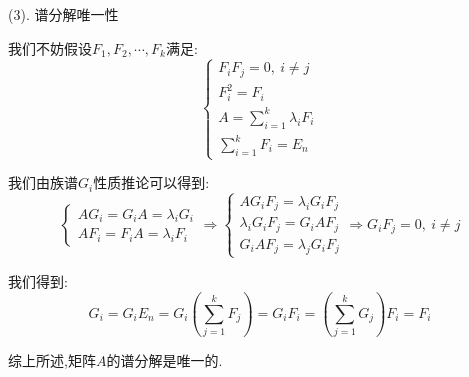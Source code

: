 \begin{anymark}[证明]
	(3). 谱分解唯一性
	
	我们不妨假设$F_{1},F_{2},\cdots,F_{k}$满足:  
	$$\left\lbrace
	\begin{array}{l}
		F_{i}F_{j}=0,\ i\neq j\\
		F_{i}^2=F_{i}\\
		A=\sum\limits_{i=1}^{k}\lambda_{i}F_{i}\\
		\sum\limits_{i=1}^{k}F_{i}=E_{n}
	\end{array}
	\right. $$
	
	我们由族谱$G_{i}$性质推论可以得到:  
	$$\left\lbrace
	\begin{array}{l}
		AG_{i}=G_{i}A=\lambda_{i}G_{i}\\
		AF_{i}=F_{i}A=\lambda_{i}F_{i}
	\end{array}
	\right. \Rightarrow \left\lbrace
	\begin{array}{l}
		AG_{i}F_{j}=\lambda_{i}G_{i}F_{j}\\
		\lambda_{i}G_{i}F_{j}=G_{i}AF_{j}\\
		G_{i}AF_{j}=\lambda_{j}G_{i}F_{j}
	\end{array}
	\right. \Rightarrow G_{i}F_{j}=0,\ i\neq j$$
	
	我们得到:  $$G_{i}=G_{i}E_{n}=G_{i}(\sum\limits_{j=1}^{k}F_{j})=G_{i}F_{i}=(\sum\limits_{j=1}^{k}G_{j})F_{i}=F_{i}$$
	
	综上所述,矩阵$A$的谱分解是唯一的.
\end{anymark}

